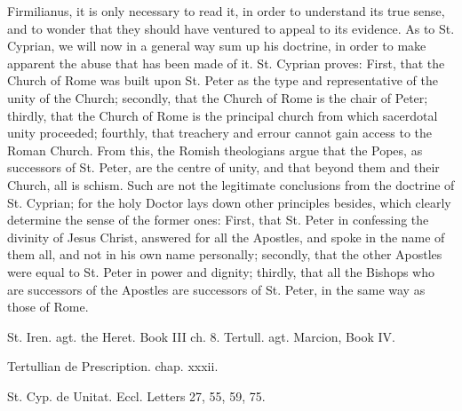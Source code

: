 Firmilianus, it is only necessary to read it, in order to understand its true sense, and to wonder that they should have ventured to appeal to its evidence. As to St. Cyprian, we will now in a general way sum up his doctrine, in order to make apparent the abuse that has been made of it. St. Cyprian proves: First, that the Church of Rome was built upon St. Peter as the type and representative of the unity of the Church; secondly, that the Church of Rome is the chair of Peter; thirdly, that the Church of Rome is the principal church from which sacerdotal unity proceeded; fourthly, that treachery and errour cannot gain access to the Roman Church. From this, the Romish theologians argue that the Popes, as successors of St. Peter, are the centre of unity, and that beyond them and their Church, all is schism. Such are not the legitimate conclusions from the doctrine of St. Cyprian; for the holy Doctor lays down other principles besides, which clearly determine the sense of the former ones: First, that St. Peter in confessing the divinity of Jesus Christ, answered for all the Apostles, and spoke in the name of them all, and not in his own name personally; secondly, that the other Apostles were equal to St. Peter in power and dignity; thirdly, that all the Bishops who are successors of the Apostles are successors of St. Peter, in the same way as those of Rome.

St. Iren. agt. the Heret. Book III ch. 8. Tertull. agt. Marcion, Book IV.

Tertullian de Prescription. chap. xxxii.

St. Cyp. de Unitat. Eccl. Letters 27, 55, 59, 75.

